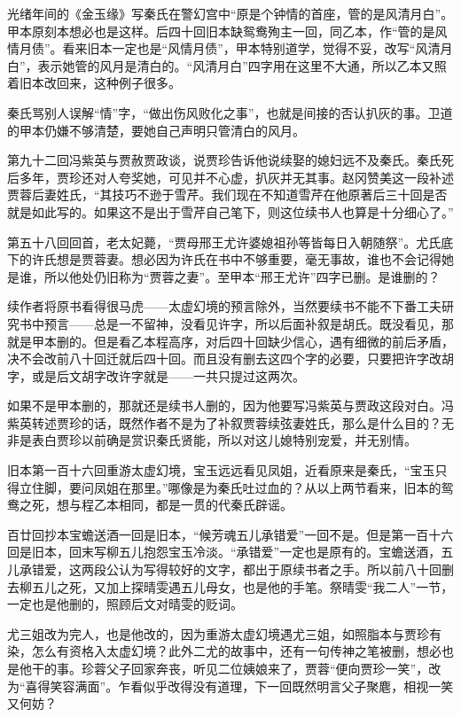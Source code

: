 \par 光绪年间的《金玉缘》写秦氏在警幻宫中“原是个钟情的首座，管的是风清月白”。甲本原刻本想必也是这样。后四十回旧本缺鸳鸯殉主一回，同乙本，作“管的是风情月债”。看来旧本一定也是“风情月债”，甲本特别道学，觉得不妥，改写“风清月白”，表示她管的风月是清白的。“风清月白”四字用在这里不大通，所以乙本又照着旧本改回来，这种例子很多。
\par 秦氏骂别人误解“情”字，“做出伤风败化之事”，也就是间接的否认扒灰的事。卫道的甲本仍嫌不够清楚，要她自己声明只管清白的风月。
\par 第九十二回冯紫英与贾赦贾政谈，说贾珍告诉他说续娶的媳妇远不及秦氏。秦氏死后多年，贾珍还对人夸奖她，可见并不心虚，扒灰并无其事。赵冈赞美这一段补述贾蓉后妻姓氏，“其技巧不逊于雪芹。我们现在不知道雪芹在他原著后三十回是否就是如此写的。如果这不是出于雪芹自己笔下，则这位续书人也算是十分细心了。”
\par 第五十八回回首，老太妃薨，“贾母邢王尤许婆媳祖孙等皆每日入朝随祭”。尤氏底下的许氏想是贾蓉妻。想必因为许氏在书中不够重要，毫无事故，谁也不会记得她是谁，所以他处仍旧称为“贾蓉之妻”。至甲本“邢王尤许”四字已删。是谁删的？
\par 续作者将原书看得很马虎——太虚幻境的预言除外，当然要续书不能不下番工夫研究书中预言——总是一不留神，没看见许字，所以后面补叙是胡氏。既没看见，那就是甲本删的。但是看乙本程高序，对后四十回缺少信心，遇有细微的前后矛盾，决不会改前八十回迁就后四十回。而且没有删去这四个字的必要，只要把许字改胡字，或是后文胡字改许字就是——一共只提过这两次。
\par 如果不是甲本删的，那就还是续书人删的，因为他要写冯紫英与贾政这段对白。冯紫英转述贾珍的话，既然作者不是为了补叙贾蓉续弦妻姓氏，那么是什么目的？无非是表白贾珍以前确是赏识秦氏贤能，所以对这儿媳特别宠爱，并无别情。
\par 旧本第一百十六回重游太虚幻境，宝玉远远看见凤姐，近看原来是秦氏，“宝玉只得立住脚，要问凤姐在那里。”哪像是为秦氏吐过血的？从以上两节看来，旧本的鸳鸯之死，想与程乙本相同，都是一贯的代秦氏辟谣。
\par 百廿回抄本宝蟾送酒一回是旧本，“候芳魂五儿承错爱”一回不是。但是第一百十六回是旧本，回末写柳五儿抱怨宝玉冷淡。“承错爱”一定也是原有的。宝蟾送酒，五儿承错爱，这两段公认为写得较好的文字，都出于原续书者之手。所以前八十回删去柳五儿之死，又加上探晴雯遇五儿母女，也是他的手笔。祭晴雯“我二人”一节，一定也是他删的，照顾后文对晴雯的贬词。
\par 尤三姐改为完人，也是他改的，因为重游太虚幻境遇尤三姐，如照脂本与贾珍有染，怎么有资格入太虚幻境？此外二尤的故事中，还有一句传神之笔被删，想必也是他干的事。珍蓉父子回家奔丧，听见二位姨娘来了，贾蓉“便向贾珍一笑”，改为“喜得笑容满面”。乍看似乎改得没有道理，下一回既然明言父子聚麀，相视一笑又何妨？
